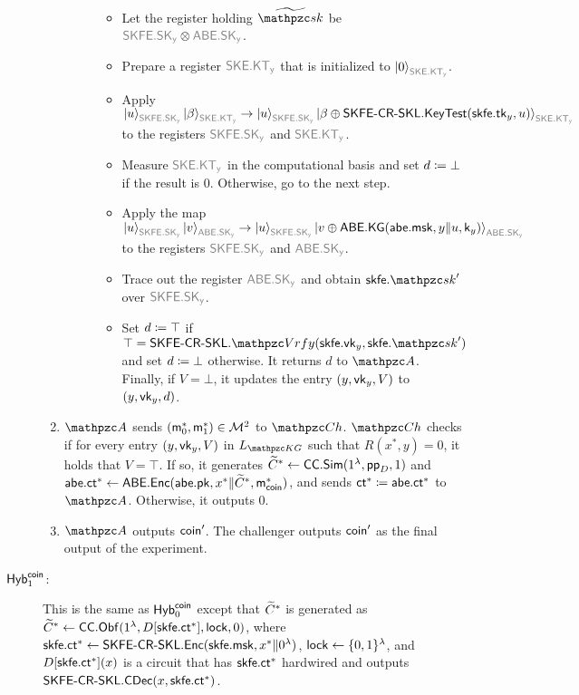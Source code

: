 \begin{description}
\begin{enumerate}
\begin{description}
\begin{itemize}
    \item Let the register holding $\widetilde{\qsk}$ be $\qreg{SKFE.SK_y}\tensor\qreg{ABE.SK_y}$.
    \item Prepare a register $\qreg{SKE.KT_y}$ that is initialized to $\ket{0}_{\qreg{SKE.KT_y}}$.
    \item Apply $\ket{u}_{\qreg{SKFE.SK_y}}\ket{\beta}_{\qreg{SKE.KT_y}}\ra\ket{u}_{\qreg{SKFE.SK_y}}\ket{\beta\oplus\SKFESKL.\KeyTest(\skfe.\tk_y,u)}_{\qreg{SKE.KT_y}}$ to the registers $\qreg{SKFE.SK_y}$ and $\qreg{SKE.KT_y}$.
    \item Measure $\qreg{SKE.KT_y}$ in the computational basis and
        set $d\coloneqq\bot$ if the result is $0$. Otherwise, go to the next step.
    \item Apply the map
        $\ket{u}_{\qreg{SKFE.SK_y}}\ket{v}_{\qreg{ABE.SK_y}}\ra\ket{u}_{\qreg{SKFE.SK_y}}\ket{v\oplus\ABE.\KG(\abe.\msk,y\|u,\key_y)}_{\qreg{ABE.SK_y}}$ to the registers $\qreg{SKFE.SK_y}$ and $\qreg{ABE.SK_y}$.
    \item Trace out the register $\qreg{ABE.SK_y}$ and obtain $\skfe.\qsk^\prime$ over $\qreg{SKFE.SK_y}$.
    \item Set $d\coloneqq\top$ if $\top=\SKFESKL.\qVrfy(\skfe.\vk_y,\skfe.\qsk^\prime)$ and set $d\coloneqq\bot$ otherwise.
It returns $d$ to $\qA$. Finally, if $V=\bot$, it updates the entry
$(y,\mathsf{vk}_y,V)$ to $(y,\mathsf{vk}_y,d)$. 
\end{itemize}
\end{description}
\item $\qA$ sends $(\mathsf{m}_0^*,\mathsf{m}_1^*)\in \mathcal{M}^2$ to
$\qCh$. $\qCh$ checks if for every entry $(y, \mathsf{vk}_y, V)$ in
$L_{\qKG}$ such that $R(x^*,y) = 0$, it holds that $V = \top$. If
so, it generates $\widetilde{C}^*\leftarrow\mathsf{CC}.\mathsf{Sim}(1^\lambda, \mathsf{pp}_D, 1)$ and
$\mathsf{abe}.\mathsf{ct}^*\leftarrow\mathsf{ABE}.\mathsf{Enc}(\mathsf{abe}.\mathsf{pk},x^*\|\widetilde{C}^*,\allowbreak\mathsf{m}_{\mathsf{coin}}^*)$, and
sends $\mathsf{ct}^*\coloneqq\mathsf{abe}.\mathsf{ct}^*$ to $\qA$. Otherwise, it outputs $0$.

\item $\qA$ outputs $\mathsf{coin}^\prime$. The challenger outputs $\mathsf{coin}'$
as the final output of the experiment.
\end{enumerate}
        
\item[$\mathsf{Hyb}_{1}^{\mathsf{coin}}$:]This is the same as $\mathsf{Hyb}_{0}^{\mathsf{coin}}$ except
that $\widetilde{C}^*$ is generated as
$\widetilde{C}^*\leftarrow\mathsf{CC}.\mathsf{Obf}(1^\lambda,D[\mathsf{skfe}.\mathsf{ct}^*], \mathsf{lock}, 0)$, where $\mathsf{skfe}.\mathsf{ct}^*\leftarrow\mathsf{SKFE}\textrm{-}\mathsf{CR}\textrm{-}\mathsf{SKL}.\mathsf{Enc}(\mathsf{skfe}.\mathsf{msk},\allowbreak x^*\|0^\lambda)$, $\mathsf{lock}\leftarrow\{0,1\}^\lambda$, and $D[\mathsf{skfe}.\mathsf{ct}^*](x)$ is a circuit that has $\mathsf{skfe}.\mathsf{ct}^*$ hardwired and outputs $\mathsf{SKFE}\textrm{-}\mathsf{CR}\textrm{-}\mathsf{SKL}.\mathsf{CDec}(x,\mathsf{skfe}.\mathsf{ct}^*)$.
\end{description}

